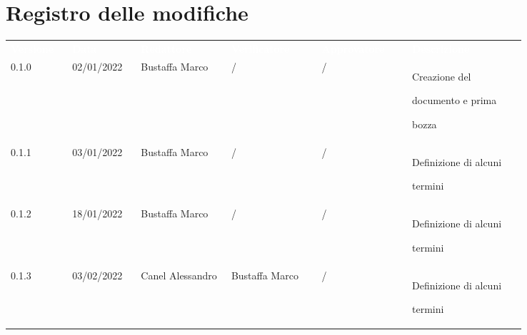 \section*{Registro delle modifiche}

{\renewcommand{\arraystretch}{1.5}
\scriptsize
\begin{tabular}{p{0.10\linewidth}p{0.10\linewidth}p{0.15\linewidth}p{0.15\linewidth}p{0.15\linewidth}p{0.19\linewidth}}
	\rowcolor[RGB]{33, 73, 50}
	\textcolor{white}{\textbf{Versione}} & \textcolor{white}{\textbf{Data}} &
	\textcolor{white}{\textbf{Redattore}} & \textcolor{white}{\textbf{Verificatore}} &
	\textcolor{white}{\textbf{Approvatore}} & \textcolor{white}{\textbf{Descrizione}}\\
	\rowcolor[RGB]{216, 235, 171}
	0.1.0 & 02/01/2022 & Bustaffa Marco & / &/& Creazione del \par documento  e prima \par bozza\\
	\rowcolor[RGB]{233, 245, 206}
	0.1.1 & 03/01/2022 & Bustaffa Marco & / &/& Definizione di alcuni \par termini\\
	\rowcolor[RGB]{216, 235, 171}
	0.1.2 & 18/01/2022 & Bustaffa Marco & / &/& Definizione di alcuni \par termini\\
	\rowcolor[RGB]{233, 245, 206}
	0.1.3 & 03/02/2022 & Canel Alessandro & Bustaffa Marco &/& Definizione di alcuni \par termini\\
\end{tabular}
}
